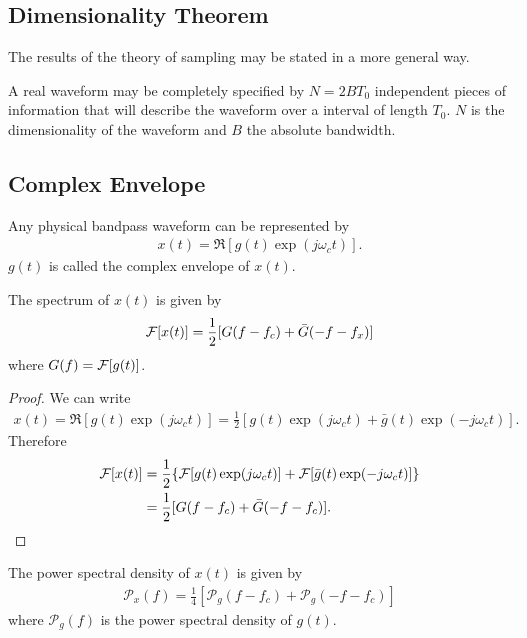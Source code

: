 \documentclass{memoir}
\begin{document}
\subsection{Dimensionality Theorem}
The results of the theory of sampling may be stated in a more general way.
\begin{theorem}[Dimensionality]
   A real waveform may be completely specified by $N=2 B T_0$ independent pieces of information that will describe the waveform over a interval of length $T_0$. $N$ is the dimensionality of the waveform and $B$ the absolute bandwidth.
\end{theorem}

\subsection{Complex Envelope}
\begin{theorem}
    Any physical bandpass waveform can be represented by
    \begin{align*}
        x(t) = \Re[g(t) \exp(j \omega_c t)].
    \end{align*}
    $g(t)$ is called the complex envelope of $x(t)$.
\end{theorem}
\begin{theorem}
    The spectrum of $x(t)$ is given by
    \begin{align*}
        \mathcal{F}[x(t)] = \frac{1}{2}[G(f-f_c)+\bar{G}(-f-f_x)]
    \end{align*}
    where $G(f) = \mathcal{F}[g(t)]$.
\end{theorem}
\begin{proof}
    We can write
    \begin{align*}
        x(t) = \Re[g(t) \exp(j \omega_c t)]
        = \frac{1}{2}[g(t) \exp(j \omega_c t) + \bar{g}(t) \exp(-j \omega_c t)].
    \end{align*}
    Therefore
    \begin{align*}
        \mathcal{F}[x(t)] &= \frac{1}{2}\{\mathcal{F}[g(t) \exp(j \omega_c t)] + \mathcal{F}[\bar{g}(t) \exp(-j \omega_c t)]\} \\
        &= \frac{1}{2}[G(f-f_c)+\bar{G}(-f-f_c)].
    \end{align*}
\end{proof}

\begin{theorem}
    The power spectral density of $x(t)$ is given by
    \begin{align*}
        \mathcal{P}_x(f) = \frac{1}{4}[\mathcal{P}_g(f-f_c) + \mathcal{P}_g(-f-f_c)]
    \end{align*}
    where $\mathcal{P}_g(f)$ is the power spectral density of $g(t)$.
\end{theorem}
\end{document}
